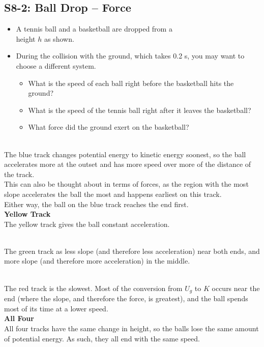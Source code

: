 \documentclass[]{article}
\begin{document}
\begin{PresentSpace}
\vspace{-10pt}
\section*{S8-2: Ball Drop -- Force}
\vspace{-10pt}
\begin{itemize}
	\item A tennis ball and a basketball are dropped from a \\
	height $h$ as shown.
	\item During the collision with the ground, which takes 0.2 s, you may want to choose a different system.
	\begin{itemize}
		\item What is the speed of each ball right before the basketball hits the ground?
		\item What is the speed of the tennis ball right after it leaves the basketball?
		\item What force did the ground exert on the basketball?
	\end{itemize}
\end{itemize}
\end{PresentSpace}
\newpage
\begin{TeacherMargin}
 \\
The blue track changes potential energy to kinetic energy soonest, so the ball accelerates more at the outset and has more speed over more of the distance of the track. \\

\noindent This can also be thought about in terms of forces, as the region with the most slope accelerates the ball the most and happens earliest on this track. \\

\noindent Either way, the ball on the blue track reaches the end first. \\
{\color{yellow}\textbf{Yellow Track}} \\
The yellow track gives the ball constant acceleration.

 \\
The green track as less slope (and therefore less acceleration) near both ends, and more slope (and therefore more acceleration) in the middle.

 \\
The red track is the slowest. Most of the conversion from $U_{g}$ to $K$ occurs near the end (where the slope, and therefore the force, is greatest), and the ball spends most of its time at a lower speed. \\

\noindent\textbf{All Four} \\
All four tracks have the same change in height, so the balls lose the same amount of potential energy. As such, they all end with the same speed.
\end{TeacherMargin}
\end{document}
